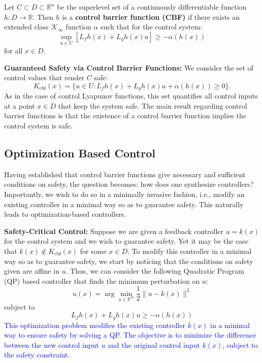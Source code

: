 \documentclass[12pt]{article}
\begin{document}
\begin{definition}
Let \( C \subset D \subset \mathbb{R}^n \) be the superlevel set of a continuously differentiable function \( h : D \to \mathbb{R} \). Then \( h \) is a \textbf{control barrier function (CBF)} if there exists an extended class \( \mathcal{K}_\infty \) function \( \alpha \) such that for the control system:
\[
\sup_{u \in U} [L_f h(x) + L_g h(x) u] \geq -\alpha(h(x))
\]
for all \( x \in D \).
\end{definition}

\textbf{Guaranteed Safety via Control Barrier Functions:}
We consider the set of control values that render \( C \) safe:
\[
K_{\text{cbf}}(x) = \{ u \in U : L_f h(x) + L_g h(x) u + \alpha(h(x)) \geq 0 \}.
\]
As in the case of control Lyapunov functions, this set quantifies all control inputs at a point \( x \in D \) that keep the system safe. The main result regarding control barrier functions is that the existence of a control barrier function implies the control system is safe.

\subsection{Optimization Based Control}
Having established that control barrier functions give necessary and sufficient conditions on safety, the question becomes: how does one synthesize controllers? Importantly, we wish to do so in a minimally invasive fashion, i.e., modify an existing controller in a minimal way so as to guarantee safety. This naturally leads to optimization-based controllers.

\textbf{Safety-Critical Control:}
Suppose we are given a feedback controller \( u = k(x) \) for the control system and we wish to guarantee safety. Yet it may be the case that \( k(x) \notin K_{\text{cbf}}(x) \) for some \( x \in D \). To modify this controller in a minimal way so as to guarantee safety, we start by noticing that the conditions on safety given are affine in \( u \). Thus, we can consider the following Quadratic Program (QP) based controller that finds the minimum perturbation on \( u \):
\[
u(x) = \arg\min_{u \in \mathbb{R}^m} \frac{1}{2} \|u - k(x)\|^2
\]
subject to
\[
L_f h(x) + L_g h(x) u \geq -\alpha(h(x))
\]
\textcolor{blue}{
This optimization problem modifies the existing controller \( k(x) \) in a minimal way to ensure safety by solving a QP. The objective is to minimize the difference between the new control input \( u \) and the original control input \( k(x) \), subject to the safety constraint.
}
\end{document}
